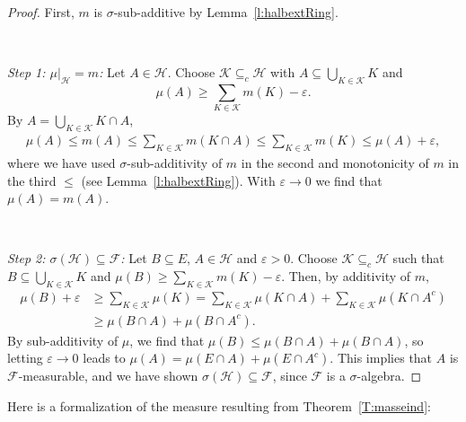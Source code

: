 \documentclass[lean]{DraftAFM}
\begin{document}
\begin{proof}
  First, $m$ is $\sigma$-sub-additive by
  Lemma~\ref{l:halbextRing}.

  ~

  \noindent\emph{Step 1: $\mu|_{\mathcal H} = m$:} Let $A\in\mathcal
  H$. Choose $\mathcal K \subseteq_c \mathcal H$ with
  $A\subseteq \bigcup_{K\in\mathcal K} K$ and
  $$\mu(A) \geq \sum_{K\in\mathcal K} m(K) - \varepsilon.$$ By $ A =
  \bigcup_{K\in\mathcal K} K\cap A$,
  \begin{align*}
    \mu(A) \leq m(A) \leq \sum_{K\in\mathcal K} m(K\cap A) \leq
    \sum_{K\in\mathcal K} m(K) \leq \mu(A) + \varepsilon,
  \end{align*}
  where we have used $\sigma$-sub-additivity of $m$ in the second and
  monotonicity of $m$ in the third $\leq$ (see
  Lemma~\ref{l:halbextRing}).  With $\varepsilon\to 0$ we find that
  $\mu(A) = m(A)$.

  ~

  \noindent\emph{Step 2: $\sigma(\mathcal H)\subseteq \mathcal F$:}
  Let $B \subseteq E$, $A\in\mathcal H$ and $\varepsilon>0$. Choose
  $\mathcal K \subseteq_c \mathcal H$ such that $B \subseteq
  \bigcup_{K \in \mathcal K} K$ and $\mu(B) \geq \sum_{K\in\mathcal K}
  m(K) - \varepsilon.$ Then, by additivity of $m$,
  \begin{align*}
    \mu(B)+\varepsilon & \geq \sum_{K\in\mathcal K} \mu(K) =
    \sum_{K\in\mathcal K} \mu(K\cap A) + \sum_{K\in\mathcal K}
    \mu(K\cap A^c) \\ & \geq \mu(B\cap A) + \mu(B\cap A^c).
  \end{align*}
  By sub-additivity of $\mu$, we find that $\mu(B) \leq \mu(B\cap A) +
  \mu(B \cap A)$, so letting $\varepsilon\to 0$ leads to $\mu(A) =
  \mu(E\cap A) + \mu(E\cap A^c)$. This implies that $A$ is $\mathcal
  F$-measurable, and we have shown $\sigma(\mathcal H) \subseteq
  \mathcal F$, since $\mathcal F$ is a $\sigma$-algebra.
\end{proof}

\noindent
Here is a formalization of the measure resulting from
Theorem~\ref{T:masseind}:

\end{document}
